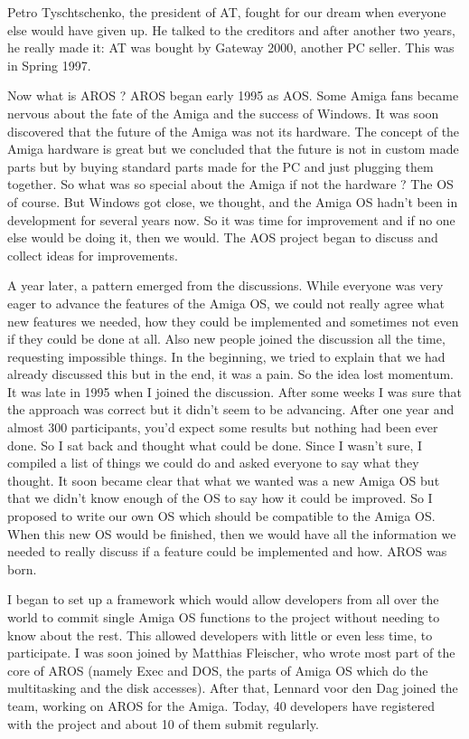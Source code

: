 Petro Tyschtschenko, the president of AT, fought for our dream when
everyone else would have given up. He talked to the creditors and after
another two years, he really made it: AT was bought by Gateway 2000,
another PC seller. This was in Spring 1997.

Now what is AROS ? AROS began early 1995 as AOS. Some Amiga fans
became nervous about the fate of the Amiga and the success of
Windows. It was soon discovered that the future of the Amiga
was not its hardware. The concept of the Amiga hardware is great but
we concluded that the future is not in custom made parts but by buying
standard parts made for the PC and just plugging them together. So what was
so special about the Amiga if not the hardware ? The OS of course. But
Windows got close, we thought, and the Amiga OS hadn't been in development for
several years now. So it was time for improvement and if no one else
would be doing it, then we would. The AOS project began to discuss and
collect ideas for improvements.

A year later, a pattern emerged from the discussions. While everyone
was very eager to advance the features of the Amiga OS, we could not
really agree what new features we needed, how they could be implemented
and sometimes not even if they could be done at all. Also new people
joined the discussion all the time, requesting impossible things. In the
beginning, we tried to explain that we had already discussed this but in
the end, it was a pain. So the idea lost momentum. It was late in 1995
when I joined the discussion. After some weeks I was sure that the approach
was correct but it didn't seem to be advancing. After one year and almost
300 participants, you'd expect some results but nothing had been ever done.
So I sat back and thought what could be done. Since I wasn't sure, I
compiled a list of things we could do and asked everyone to say what they
thought. It soon became clear that what we wanted was a new Amiga OS but
that we didn't know enough of the OS to say how it could be improved.
So I proposed to write our own OS which should be compatible to the
Amiga OS. When this new OS would be finished, then we would have all the
information we needed to really discuss if a feature could be implemented
and how. AROS was born.

I began to set up a framework which would allow developers from all over the
world to commit single Amiga OS functions to the project without needing
to know about the rest. This allowed developers with little or even less
time, to participate. I was soon joined by Matthias Fleischer, who
wrote most part of the core of AROS (namely Exec and DOS, the parts of
Amiga OS which do the multitasking and the disk accesses). After that,
Lennard voor den Dag joined the team, working on AROS for the Amiga.
Today, 40 developers have registered with the project and about 10 of them
submit regularly.


